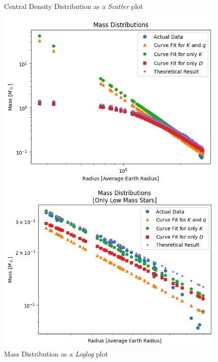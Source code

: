 \documentclass[letterpaper,12pt]{article}
\begin{document}
\begin{figure}[H]
\begin{minipage}{.5\textwidth}
\end{minipage}
\caption{Central Density Distribution as a \textit{Scatter} plot}
\label{fig:34}
\end{figure}



\begin{figure}[H]
\begin{minipage}{.5\textwidth}
\centerline{\includegraphics[width=\linewidth]{figures/7_n_ll_ms_r.png}}
\end{minipage}
\begin{minipage}{.5\textwidth}
\centerline{\includegraphics[width=\linewidth]{figures/8_n_ll_ms_r_.png}}
\end{minipage}
\caption{Mass Distribution as a \textit{Loglog} plot}
\label{fig:78}
\end{figure}
\end{document}
